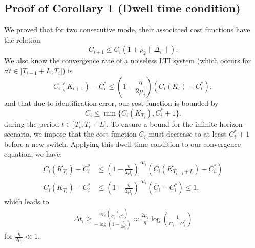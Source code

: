 \documentclass[letterpaper, 10 pt, conference]{ieeeconf}  %
\begin{document}
\subsection{Proof of Corollary 1 (Dwell time condition)}
We proved that for two consecutive mode, their associated cost functions have the relation \begin{equation}
    \overline{C}_{i+1} \leq \overline{C}_i (1+\overline{p}_2 \|\Delta_i\|).
\end{equation} 
We also know the convergence rate of a noiseless LTI system (which occurs for $\forall t \in ]T_{i-1} + L, T_i]$) is 
\begin{equation}
C_i(K_{t+1}) - C_i^* \leq (1 - \frac{\eta}{2\mu_i}) (C_i(K_t) -C_i^*),
\end{equation}
and that due to identification error, our cost function is bounded by
\begin{equation}
    C_i \leq \min \{ C_i(K_{T_i}), C_i^* + 1\}.
\end{equation}
 during the period $ t \in ]T_i, T_i + L]$. To ensure a bound for the infinite horizon scenario, we impose that the cost function $C_i$ must decrease to at least $C_i^* + 1$ before a new switch. Applying this dwell time condition to our convergence equation, we have:
\begin{equation}
\begin{aligned}
    C_i(K_{T_{i}}) - C_i^* &\leq (1 - \frac{\eta}{2\mu_i})^{\Delta t_i} (C_i(K_{T_{i-1}+L}) -C_i^*) \\
     C_i(K_{T_{i}}) - C_i^* &\leq (1 - \frac{\eta}{2\mu_i})^{\Delta t_i} (\overline{C}_i -C_i^*) 
    \leq 1,
\end{aligned}
\end{equation}
which leads to 
\begin{equation}
\begin{aligned}
    \Delta t_i \geq \frac{\log\left( \frac{1}{\overline{C}_i - C_i^*} \right)}{-\log\left(1 - \frac{\eta}{2\mu_i} \right)} \approx \frac{2\mu_i}{\eta}\log\left( \frac{1}{\overline{C}_i - C_i^*} \right) 
\end{aligned}
\end{equation}
for $\frac{\eta}{2\mu_i} \ll 1$.


	
\end{document}
